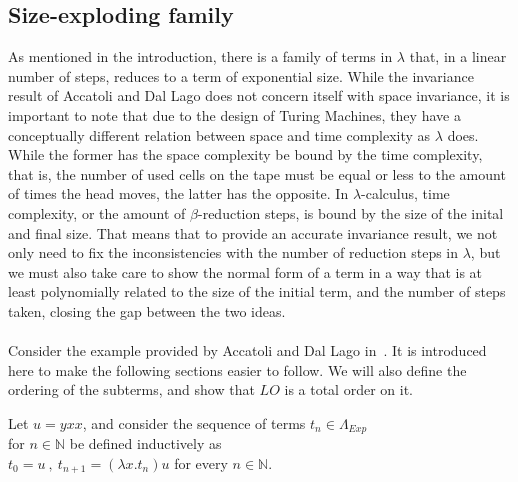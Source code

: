 \documentclass[11pt]{article}
\begin{document}
\subsection{Size-exploding family}
As mentioned in the introduction, there is a family of terms in $\lambda$ that, in a linear number of steps, reduces to a term of exponential size. While the invariance result of Accatoli and Dal Lago does not concern itself with space invariance, it is important to note that due to the design of Turing Machines, they have a conceptually different relation between space and time complexity as $\lambda$ does. While the former has the space complexity be bound by the time complexity, that is, the number of used cells on the tape must be equal or less to the amount of times the head moves, the latter has the opposite. In $\lambda$-calculus, time complexity, or the amount of $\beta$-reduction steps, is bound by the size of the inital and final size. That means that to provide an accurate invariance result, we not only need to fix the inconsistencies with the number of reduction steps in $\lambda$, but we must also take care to show the normal form of a term in a way that is at least polynomially related to the size of the initial term, and the number of steps taken, closing the gap between the two ideas.
\\ \\
Consider the example provided by Accatoli and Dal Lago in~\cite{beta-invariance}. It is introduced here to make the following sections easier to follow. We will also define the ordering of the subterms, and show that $LO$ is a total order on it.
\begin{center}
  Let $u = yxx$, and consider the sequence of terms $t_{n} \in \Lambda_{Exp}$  \\ for $n \in \mathbb{N}$ be defined inductively as \\
  $t_{0} = u \ , \ t_{n + 1} = (\lambda x.t_{n})u$ for every $n \in \mathbb{N}$.
\end{center}
\end{document}
